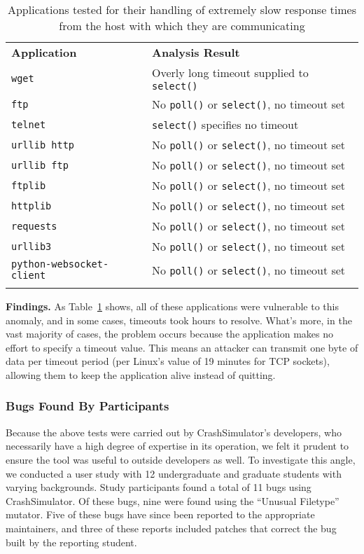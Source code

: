 \begin{table}[t]
  \scriptsize{}
  \begin{tabular}{l | l}
    \toprule{}
    {\bf Application}              & {\bf Analysis Result}\\
    {\tt wget}                     & Overly long timeout supplied to {\tt select()} \\
    {\tt ftp}                      & No {\tt poll()} or {\tt select()}, no timeout set \\
    {\tt telnet}                   & {\tt select()} specifies no timeout \\
    {\tt urllib http}              & No {\tt poll()} or {\tt select()}, no timeout set \\
    {\tt urllib ftp}               & No {\tt poll()} or {\tt select()}, no timeout set \\
    {\tt ftplib}                   & No {\tt poll()} or {\tt select()}, no timeout set \\
    {\tt httplib}                  & No {\tt poll()} or {\tt select()}, no timeout set \\
    {\tt requests}                 & No {\tt poll()} or {\tt select()}, no timeout set \\
    {\tt urllib3}                  & No {\tt poll()} or {\tt select()}, no timeout set \\
    {\tt python-websocket-client}  & No {\tt poll()} or {\tt select()}, no timeout set \\
    \bottomrule{}
  \end{tabular}
  \caption{Applications tested for their handling of extremely slow response
    times from the host with which they are communicating }
  \label{table:slowloris}
\end{table}


{\bf Findings.}
As Table~\ref{table:slowloris} shows, all of these
applications were vulnerable to this anomaly,
and in some cases,
timeouts took hours to resolve.
What's more, in the vast majority of
cases, the problem occurs because the application makes no effort to
specify a timeout value.  This means an attacker can transmit one byte of
data per timeout period (per Linux's value of 19 minutes for TCP sockets),
allowing them to keep the application alive instead of quitting.

\subsubsection{Bugs Found By Participants}
Because the above tests were carried out by CrashSimulator's developers,
who necessarily have a high degree of expertise in its operation,
we felt it prudent to ensure the tool was useful
to outside developers as well.
To investigate this angle,
we conducted a user study
with 12 undergraduate and graduate students with varying backgrounds.
Study participants found a total of 11 bugs using CrashSimulator.
Of these bugs, nine were found using the ``Unusual Filetype'' mutator.
Five of these bugs have since been reported to the appropriate maintainers,
and three of these reports included patches
that correct the bug
built by the reporting student.

